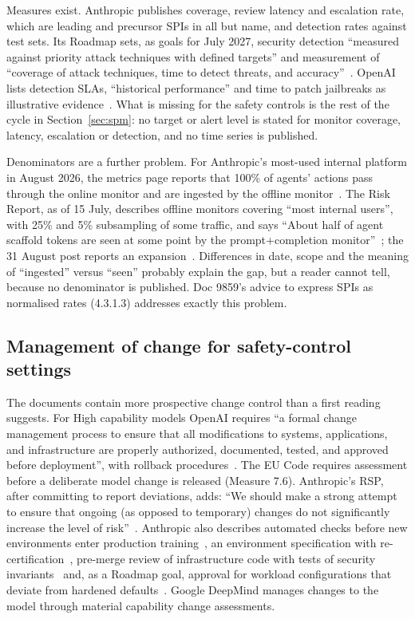 \documentclass[11pt]{article}
\begin{document}
Measures exist. Anthropic publishes coverage, review latency and escalation rate, which are leading and precursor SPIs in all but name, and detection rates against test sets. Its Roadmap sets, as goals for July 2027, security detection ``measured against priority attack techniques with defined targets'' and measurement of ``coverage of attack techniques, time to detect threats, and accuracy''~\cite{anthropic2026roadmap}. OpenAI lists detection SLAs, ``historical performance'' and time to patch jailbreaks as illustrative evidence~\cite[App.~C.1]{openai2025pf}. What is missing for the safety controls is the rest of the cycle in Section~\ref{sec:spm}: no target or alert level is stated for monitor coverage, latency, escalation or detection, and no time series is published.

Denominators are a further problem. For Anthropic's most-used internal platform in August 2026, the metrics page reports that 100\% of agents' actions pass through the online monitor and are ingested by the offline monitor~\cite{favaro2026}. The Risk Report, as of 15 July, describes offline monitors covering ``most internal users'', with 25\% and 5\% subsampling of some traffic, and says ``About half of agent scaffold tokens are seen at some point by the prompt+completion monitor''~\cite[Sec.~2.23.1.1]{anthropic2026riskreport}; the 31 August post reports an expansion~\cite{anthropic2026improving}. Differences in date, scope and the meaning of ``ingested'' versus ``seen'' probably explain the gap, but a reader cannot tell, because no denominator is published. Doc 9859's advice to express SPIs as normalised rates (4.3.1.3) addresses exactly this problem.

\subsection{Management of change for safety-control settings}\label{sec:gap-moc}

The documents contain more prospective change control than a first reading suggests. For High capability models OpenAI requires ``a formal change management process to ensure that all modifications to systems, applications, and infrastructure are properly authorized, documented, tested, and approved before deployment'', with rollback procedures~\cite[App.~C.3]{openai2025pf}. The EU Code requires assessment before a deliberate model change is released (Measure 7.6). Anthropic's RSP, after committing to report deviations, adds: ``We should make a strong attempt to ensure that ongoing (as opposed to temporary) changes do not significantly increase the level of risk''~\cite[Sec.~3.2]{anthropic2026rsp}. Anthropic also describes automated checks before new environments enter production training~\cite[Sec.~5.2.3]{anthropic2026riskreport}, an environment specification with re-certification~\cite{anthropic2026improving}, pre-merge review of infrastructure code with tests of security invariants~\cite[Sec.~2.23.2.3]{anthropic2026riskreport} and, as a Roadmap goal, approval for workload configurations that deviate from hardened defaults~\cite{anthropic2026roadmap}. Google DeepMind manages changes to the model through material capability change assessments.
\end{document}
